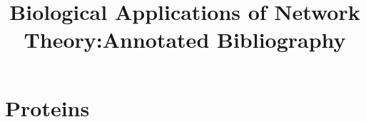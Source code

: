 

\bibliographyunit[\section]

\title{Biological Applications of Network Theory:Annotated Bibliography} 

\author{
}

\maketitle
\section{Proteins}
\nocite{PhysRevE.65.061910}
\nocite{000186918300012}
\nocite{Sol:2006uq}
\nocite{17531094}
\nocite{1562092}
\putbib
